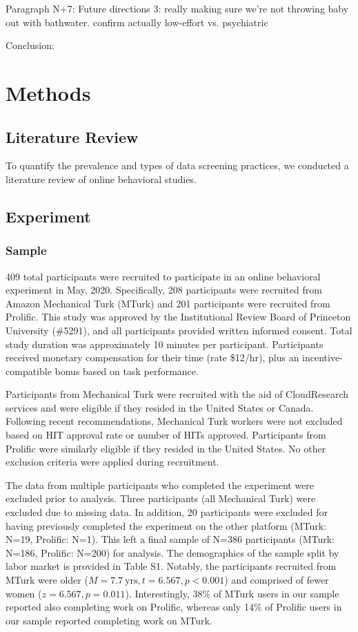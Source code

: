\documentclass[a4paper,notitlepage,12pt]{article}
\begin{document}
Paragraph N+7: Future directions 3: really making sure we're not throwing baby out with bathwater. confirm actually low-effort vs. psychiatric

Conclusion: 

\section{Methods}

\subsection{Literature Review}

To quantify the prevalence and types of data screening practices, we conducted a literature review of online behavioral studies.

\subsection{Experiment}

\subsubsection{Sample}

409 total participants were recruited to participate in an online behavioral experiment in May, 2020. Specifically, 208 participants were recruited from Amazon Mechanical Turk (MTurk) and 201 participants were recruited from Prolific.  This study was approved by the Institutional Review Board of Princeton University (\#5291), and all participants provided written informed consent. Total study duration was approximately 10 minutes per participant. Participants received monetary compensation for their time (rate \$12/hr), plus an incentive-compatible bonus based on task performance. 

Participants from Mechanical Turk were recruited with the aid of CloudResearch services and were eligible if they resided in the United States or Canada. Following recent recommendations, Mechanical Turk workers were not excluded based on HIT approval rate or number of HITs approved. Participants from Prolific were similarly eligible if they resided in the United States. No other exclusion criteria were applied during recruitment. 

The data from multiple participants who completed the experiment were excluded prior to analysis. Three participants (all Mechanical Turk) were excluded due to missing data. In addition, 20 participants were excluded for having previously completed the experiment on the other platform (MTurk: N=19, Prolific: N=1). This left a final sample of N=386 participants (MTurk: N=186, Prolific: N=200) for analysis. The demographics of the sample split by labor market is provided in Table S1. Notably, the participants recruited from MTurk were older ($M = 7.7 \ \text{yrs}, t = 6.567, p < 0.001$) and comprised of fewer women ($z = 6.567, p = 0.011$). Interestingly, 38\% of MTurk users in our sample reported also completing work on Prolific, whereas only 14\% of Prolific users in our sample reported completing work on MTurk. 
\end{document}
